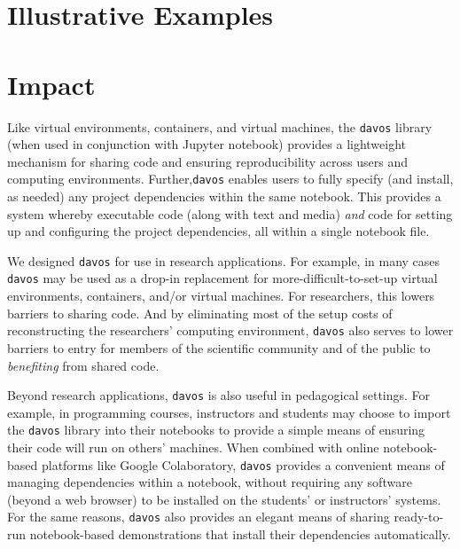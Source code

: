 \documentclass[preprint,12pt, a4paper]{elsarticle}
\begin{document}
\section{Illustrative Examples}



\section{Impact}

Like virtual environments, containers, and virtual machines, 
the \texttt{davos} library (when used in conjunction with Jupyter
notebook) provides a lightweight mechanism for sharing code and
ensuring reproducibility across users and computing environments.
Further,\texttt{davos} enables users to fully specify (and
install, as needed) any project dependencies within the same
notebook.  This provides a system whereby executable code (along with
text and media) \textit{and} code for setting up and configuring the
project dependencies, all within a single notebook file.

We designed \texttt{davos} for use in research applications.  For
example, in many cases \texttt{davos} may be used as a drop-in
replacement for more-difficult-to-set-up virtual environments,
containers, and/or virtual machines.  For researchers, this lowers barriers to sharing
code.  And by eliminating most of the setup costs of reconstructing
the researchers' computing environment, \texttt{davos} also serves to
lower barriers to entry for members of the scientific community and of
the public to \textit{benefiting} from shared code.

Beyond research applications, \texttt{davos} is also useful in
pedagogical settings.  For example, in programming courses,
instructors and students may choose to import the \texttt{davos}
library into their notebooks to provide a simple means of ensuring
their code will run on others' machines.  When combined with online
notebook-based platforms like Google Colaboratory, \texttt{davos}
provides a convenient means of managing dependencies within a
notebook, without requiring any software (beyond a web browser) to be
installed on the students' or instructors' systems.  For the same
reasons, \texttt{davos} also provides an elegant means of sharing
ready-to-run notebook-based demonstrations that install their
dependencies automatically.
\end{document}
